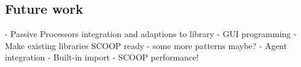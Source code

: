 \documentclass[a4paper,10pt]{article}
\begin{document}
\subsection{Future work}

- Passive Processors integration and adaptions to library
- GUI programming
- Make existing libraries SCOOP ready
- some more patterns maybe?
- Agent integration
- Built-in import
- SCOOP performance!



\begin{appendix}


\end{appendix}

\todos
\end{document}
